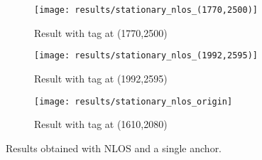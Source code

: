 \begin{figure}[h!]
    \centering
    \begin{subfigure}{0.49\textwidth}
            \texttt{[image: results/stationary\_nlos\_(1770,2500)]}
            \caption{Result with tag at (1770,2500)}
    \end{subfigure}
    \begin{subfigure}{0.49\textwidth}
            \texttt{[image: results/stationary\_nlos\_(1992,2595)]}
            \caption{Result with tag at (1992,2595)}
    \end{subfigure}
    \begin{subfigure}{0.5\textwidth}
            \texttt{[image: results/stationary\_nlos\_origin]}
            \caption{Result with tag at (1610,2080)}
    \end{subfigure}
    \caption{Results obtained with NLOS and a single anchor.}
    \label{fig:stat_anchors}
\end{figure}
\newpage
